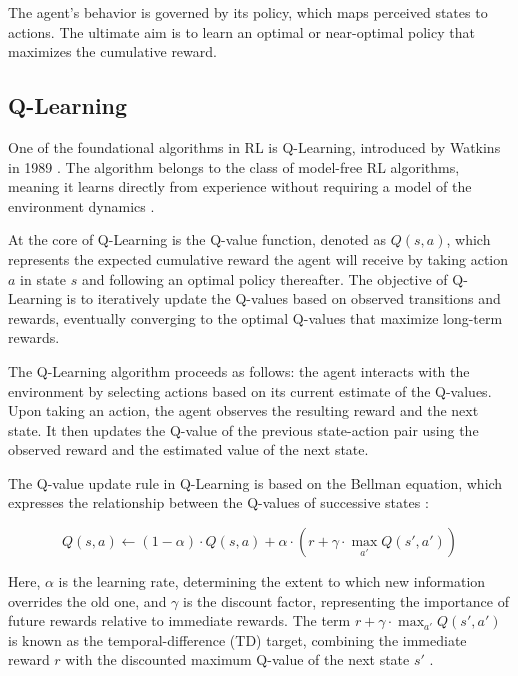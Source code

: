 The agent's behavior is governed by its policy, which maps perceived states to actions. The ultimate aim is to learn an optimal or near-optimal policy that maximizes the cumulative reward. 

\subsection{Q-Learning}

One of the foundational algorithms in RL is Q-Learning, introduced by Watkins in 1989 \cite{watkins1989learning}. The algorithm belongs to the class of model-free RL algorithms, meaning it learns directly from experience without requiring a model of the environment dynamics \cite{russel2020ai}.

At the core of Q-Learning is the Q-value function, denoted as $Q(s, a)$, which represents the expected cumulative reward the agent will receive by taking action $a$ in state $s$ and following an optimal policy thereafter. The objective of Q-Learning is to iteratively update the Q-values based on observed transitions and rewards, eventually converging to the optimal Q-values that maximize long-term rewards.

The Q-Learning algorithm proceeds as follows: the agent interacts with the environment by selecting actions based on its current estimate of the Q-values. Upon taking an action, the agent observes the resulting reward and the next state. It then updates the Q-value of the previous state-action pair using the observed reward and the estimated value of the next state.

The Q-value update rule in Q-Learning is based on the Bellman equation, which expresses the relationship between the Q-values of successive states \cite{russel2020ai}:

\[
Q(s, a) \leftarrow (1 - \alpha) \cdot Q(s, a) + \alpha \cdot \left( r + \gamma \cdot \max_{a'} Q(s', a') \right)
\]

Here, $\alpha$ is the learning rate, determining the extent to which new information overrides the old one, and $\gamma$ is the discount factor, representing the importance of future rewards relative to immediate rewards. The term $r + \gamma \cdot \max_{a'} Q(s', a')$ is known as the temporal-difference (TD) target, combining the immediate reward $r$ with the discounted maximum Q-value of the next state $s'$ \cite{russel2020ai}.


